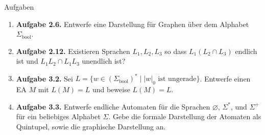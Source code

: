 \documentclass[11pt,aspectratio=169]{beamer}
\begin{document}

\begin{frame}{Aufgaben}
    \begin{enumerate}
        \justifying
        \item \textbf{Aufgabe 2.6.}
            Entwerfe eine Darstellung für Graphen über dem Alphabet
            \(\Sigma_{\text{bool}}\).

        \item \textbf{Aufgabe 2.12.}
            Existieren Sprachen \(L_1, L_2, L_3\) so dass \(L_1(L_2 \cap L_3)\)
            endlich ist und \(L_1 L_2 \cap L_1 L_3\) unendlich ist?

        \item \textbf{Aufgabe 3.2.}
            Sei \(L = \{w \in (\Sigma_{\text{bool}})^* \mid |w|_0 \text{ ist ungerade}\}\).
            Entwerfe einen EA \(M\) mit \(L(M) = L\) und beweise \(L(M) = L\).

        \item \textbf{Aufgabe 3.3.}
            Entwerfe endliche Automaten für die Sprachen \(\varnothing\),
            \(\Sigma^*\), und \(\Sigma^+\) für ein beliebiges Alphabet \(\Sigma\).
            Gebe die formale Darstellung der Atomaten als Quintupel, sowie die
            graphische Darstellung an.
    \end{enumerate}
\end{frame}
\end{document}
